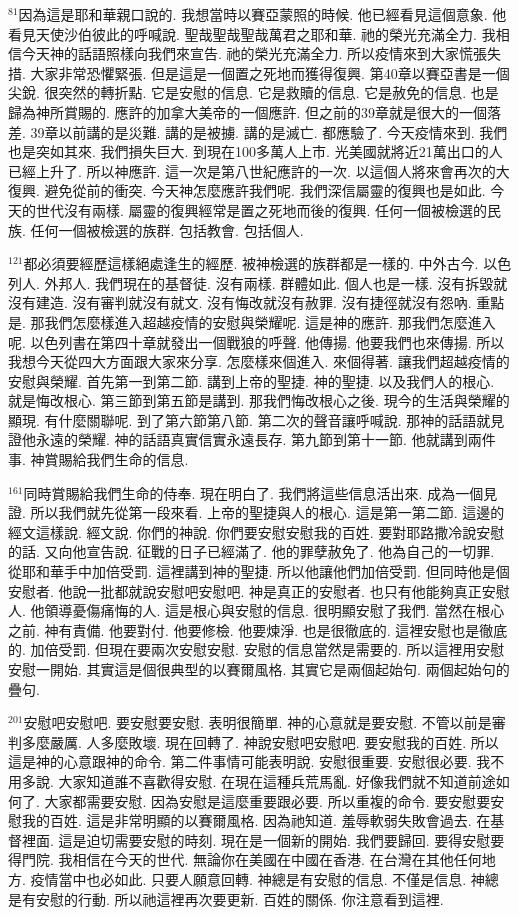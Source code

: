 \documentclass{book}
\begin{document}
$^{81}$因為這是耶和華親口說的.
我想當時以賽亞蒙照的時候.
他已經看見這個意象.
他看見天使沙伯彼此的呼喊說.
聖哉聖哉聖哉萬君之耶和華.
祂的榮光充滿全力.
我相信今天神的話語照樣向我們來宣告.
祂的榮光充滿全力.
所以疫情來到大家慌張失措.
大家非常恐懼緊張.
但是這是一個置之死地而獲得復興.
第40章以賽亞書是一個尖銳.
很突然的轉折點.
它是安慰的信息.
它是救贖的信息.
它是赦免的信息.
也是歸為神所賞賜的.
應許的加拿大美帝的一個應許.
但之前的39章就是很大的一個落差.
39章以前講的是災難.
講的是被擄.
講的是滅亡.
都應驗了.
今天疫情來到.
我們也是突如其來.
我們損失巨大.
到現在100多萬人上市.
光美國就將近21萬出口的人已經上升了.
所以神應許.
這一次是第八世紀應許的一次.
以這個人將來會再次的大復興.
避免從前的衝突.
今天神怎麼應許我們呢.
我們深信屬靈的復興也是如此.
今天的世代沒有兩樣.
屬靈的復興經常是置之死地而後的復興.
任何一個被檢選的民族.
任何一個被檢選的族群.
包括教會.
包括個人.

$^{121}$都必須要經歷這樣絕處逢生的經歷.
被神檢選的族群都是一樣的.
中外古今.
以色列人.
外邦人.
我們現在的基督徒.
沒有兩樣.
群體如此.
個人也是一樣.
沒有拆毀就沒有建造.
沒有審判就沒有就文.
沒有悔改就沒有赦罪.
沒有捷徑就沒有怨吶.
重點是.
那我們怎麼樣進入超越疫情的安慰與榮耀呢.
這是神的應許.
那我們怎麼進入呢.
以色列書在第四十章就發出一個戰狼的呼聲.
他傳揚.
他要我們也來傳揚.
所以我想今天從四大方面跟大家來分享.
怎麼樣來個進入.
來個得著.
讓我們超越疫情的安慰與榮耀.
首先第一到第二節.
講到上帝的聖捷.
神的聖捷.
以及我們人的根心.
就是悔改根心.
第三節到第五節是講到.
那我們悔改根心之後.
現今的生活與榮耀的顯現.
有什麼關聯呢.
到了第六節第八節.
第二次的聲音讓呼喊說.
那神的話語就見證他永遠的榮耀.
神的話語真實信實永遠長存.
第九節到第十一節.
他就講到兩件事.
神賞賜給我們生命的信息.

$^{161}$同時賞賜給我們生命的侍奉.
現在明白了.
我們將這些信息活出來.
成為一個見證.
所以我們就先從第一段來看.
上帝的聖捷與人的根心.
這是第一第二節.
這邊的經文這樣說.
經文說.
你們的神說.
你們要安慰安慰我的百姓.
要對耶路撒冷說安慰的話.
又向他宣告說.
征戰的日子已經滿了.
他的罪孽赦免了.
他為自己的一切罪.
從耶和華手中加倍受罰.
這裡講到神的聖捷.
所以他讓他們加倍受罰.
但同時他是個安慰者.
他說一批都就說安慰吧安慰吧.
神是真正的安慰者.
也只有他能夠真正安慰人.
他領導憂傷痛悔的人.
這是根心與安慰的信息.
很明顯安慰了我們.
當然在根心之前.
神有責備.
他要對付.
他要修檢.
他要煉淨.
也是很徹底的.
這裡安慰也是徹底的.
加倍受罰.
但現在要兩次安慰安慰.
安慰的信息當然是需要的.
所以這裡用安慰安慰一開始.
其實這是個很典型的以賽爾風格.
其實它是兩個起始句.
兩個起始句的疊句.

$^{201}$安慰吧安慰吧.
要安慰要安慰.
表明很簡單.
神的心意就是要安慰.
不管以前是審判多麼嚴厲.
人多麼敗壞.
現在回轉了.
神說安慰吧安慰吧.
要安慰我的百姓.
所以這是神的心意跟神的命令.
第二件事情可能表明說.
安慰很重要.
安慰很必要.
我不用多說.
大家知道誰不喜歡得安慰.
在現在這種兵荒馬亂.
好像我們就不知道前途如何了.
大家都需要安慰.
因為安慰是這麼重要跟必要.
所以重複的命令.
要安慰要安慰我的百姓.
這是非常明顯的以賽爾風格.
因為祂知道.
羞辱軟弱失敗會過去.
在基督裡面.
這是迫切需要安慰的時刻.
現在是一個新的開始.
我們要歸回.
要得安慰要得門院.
我相信在今天的世代.
無論你在美國在中國在香港.
在台灣在其他任何地方.
疫情當中也必如此.
只要人願意回轉.
神總是有安慰的信息.
不僅是信息.
神總是有安慰的行動.
所以祂這裡再次要更新.
百姓的關係.
你注意看到這裡.
\end{document}
